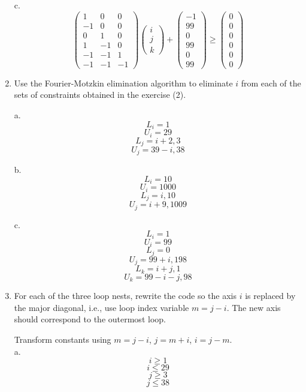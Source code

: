 \documentclass[11pt]{article}
\begin{document}
\begin{enumerate}
\begin{Answer}
		c.
		$$
		\begin{pmatrix}
		1 & 0 & 0  \\
		-1 & 0 & 0  \\
		0 & 1 & 0 \\
		1 & -1 & 0 \\
		-1 & -1 & 1 \\
		-1 & -1 & -1 
		\end{pmatrix}
		\begin{pmatrix}
		i \\
		j \\
		k
		\end{pmatrix}
		+
		\begin{pmatrix}
		-1 \\
		99 \\
		0 \\
		99 \\
		0 \\
		99
		\end{pmatrix}
		\ge
		\begin{pmatrix}
		0 \\
		0 \\
		0 \\
		0 \\
		0 \\
		0 
		\end{pmatrix}
		$$
		\end{Answer}
		\newpage
	\item Use the Fourier-Motzkin elimination algorithm to eliminate $i$ from each of the sets of constraints obtained in the exercise (2).
		\begin{Answer}
		a. 
		$$L_i = 1$$
		$$U_i = 29$$
		$$L_j = i + 2, 3$$
		$$U_j = 39 - i, 38$$
		
		b.
		$$L_i = 10$$
		$$U_i = 1000$$
		$$L_j = i, 10$$
		$$U_j = i + 9, 1009$$
		
		c.
		$$L_i = 1$$
		$$U_i = 99$$
		$$L_j = 0$$
		$$U_j = 99 + i, 198$$
		$$L_k = i + j, 1$$
		$$U_k = 99 - i - j, 98$$
		\end{Answer}
		\newpage
	\item For each of the three loop nests, rewrite the code so the axis $i$ is replaced by the major diagonal, i.e., use loop index variable $m=j-i$. The new axis should correspond to the outermost loop.
		\begin{Answer}
		Transform constants using $m=j -i$, $j = m + i$, $i = j - m$. \\
		a. 
		$$i \ge 1$$
		$$i \le 29$$
		$$j \ge 3$$
		$$j \le 38$$
		

\end{Answer}
\end{enumerate}
\end{document}
